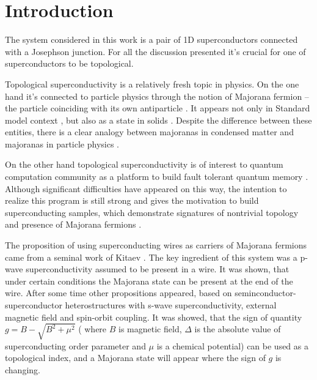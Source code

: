 \chapter{Introduction}


The system considered in this work is a pair of 1D superconductors connected with a Josephson junction. For all the discussion presented it's crucial for one of superconductors to be topological. 

Topological superconductivity is a relatively fresh topic in physics. On the one hand it's connected to particle physics through the notion of Majorana fermion -- the particle coinciding with its own antiparticle \cite{Majorana_1937}. It appears not only in Standard model context 
\cite{particle_majorana_Avignone,
	particle_majorana_Giuliani,
	particle_majorana_Marcocci}
, but also as a state in solids \cite{	majorana_condmat_Rossi,
	majorana_condmat_Kitaev,
	majorana_condmat_Kopnin,
	majorana_condmat_Motrunich,
	majorana_condmat_Nayak,
	majorana_condmat_Read_Green,
	majorana_condmat_Senthil,	majorana_condmat_Volovik,
	majorana_condmat_Fu_Kane,	
	review_majorana_Aguado,	
	review_majorana_Beenakker,
	review_majorana_Oppen}. Despite the difference between these entities, there is a clear analogy between majoranas in condensed matter and majoranas in particle physics \cite{Dirak_BdG_Chamon,Dirak_BdG_Elliott}.

 On the other hand topological superconductivity is of interest to quantum computation community as a platform to build fault tolerant quantum memory \cite{majorana_condmat_Kitaev,quintum_computation_Alicea,quintum_computation_Nayak,quintum_computation_Romito}. Although significant difficulties have appeared on this way, the intention to realize this program is still strong and gives the motivation to build superconducting samples, which demonstrate signatures of nontrivial topology and presence of Majorana fermions \cite{majorana_experiment_Kouwenhoven,majorana_experiment_Vaitiekėnas,majorana_experiment_Zhang}.
 
The proposition of using superconducting wires as carriers of Majorana fermions came from a seminal work of Kitaev \cite{majorana_condmat_Kitaev}. The key ingredient of this system was a p-wave superconductivity assumed to be present in a wire. It was shown, that under certain conditions the Majorana state can be present at the end of the wire. After some time other propositions \cite{Oreg_2010,Lutchyn_2010} appeared, based on seminconductor-superconductor heterostructures with s-wave superconductivity, external magnetic field and spin-orbit coupling. It was showed, that the sign of quantity $ g=B-\sqrt{B^2+\mu^2} $ ( where $ B $ is magnetic field, $ \Delta $ is the absolute value of superconducting order parameter and $ \mu $ is a chemical potential) can be used as a topological index, and a Majorana state will appear where the sign of $g $ is changing.

